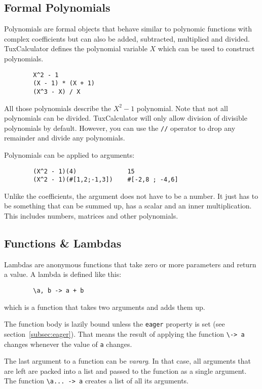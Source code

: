 \documentclass[10pt]{article}
\begin{document}
    \subsection{Formal Polynomials}\label{subsec:polynomials}
    Polynomials are formal objects that behave similar to polynomic functions with complex coefficients but can also be added, subtracted, multiplied and divided.
    TuxCalculator defines the polynomial variable $ X $ which can be used to construct polynomials.
    \begin{verbatim}
        X^2 - 1
        (X - 1) * (X + 1)
        (X^3 - X) / X
    \end{verbatim}
    All those polynomials describe the $ X^2 - 1 $ polynomial.
    Note that not all polynomials can be divided.
    TuxCalculator will only allow division of divisible polynomials by default.
    However, you can use the \verb|//| operator to drop any remainder and divide any polynomials.
    
    Polynomials can be applied to arguments:
    \begin{verbatim}
        (X^2 - 1)(4)              15
        (X^2 - 1)(#[1,2;-1,3])    #[-2,8 ; -4,6]
    \end{verbatim}
    Unlike the coefficients, the argument does not have to be a number. It just has to be something that can be summed up, has a scalar and an inner multiplication.
    This includes numbers, matrices and other polynomials.
    
    \subsection{Functions \& Lambdas}\label{subsec:lambdas}
    Lambdas are anonymous functions that take zero or more parameters and return a value.
    A lambda is defined like this:
    \begin{verbatim}
        \a, b -> a + b
    \end{verbatim}
    which is a function that takes two arguments and adds them up.
    
    The function body is lazily bound unless the \verb|eager| property is set (see section~\ref{subsec:eager}).
    That means the result of applying the function \verb|\-> a| changes whenever the value of \verb|a| changes.
    
    The last argument to a function can be \textsl{vararg}.
    In that case, all arguments that are left are packed into a list and passed to the function as a single argument.
    The function \verb|\a... -> a| creates a list of all its arguments.
    
\end{document}
